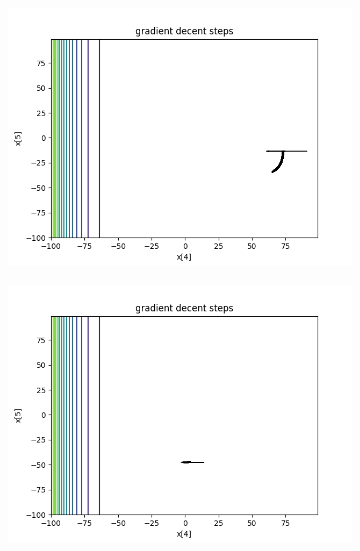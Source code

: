 		\begin{figure}[h!]
		\centering
		\begin{subfigure}[b]{0.45\linewidth}
			\includegraphics[width=\linewidth]{photos/f2_1_2.png}
		\end{subfigure}
		\begin{subfigure}[b]{0.45\linewidth}
			\includegraphics[width=\linewidth]{photos/f2_2_2.png}
		\end{subfigure}
		\begin{subfigure}[b]{0.45\linewidth}

\end{subfigure}
\end{figure}
